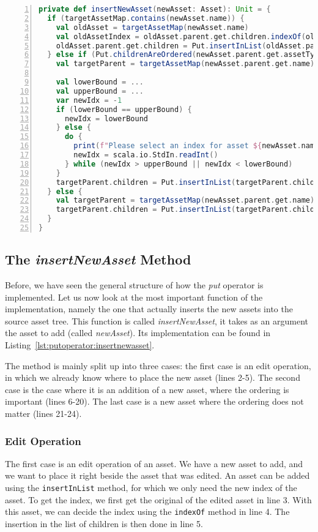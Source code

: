 \begin{lstfloat}
\begin{lstlisting}[language=Scala,numbers=left,showstringspaces=false]
private def insertNewAsset(newAsset: Asset): Unit = {
  if (targetAssetMap.contains(newAsset.name)) {
    val oldAsset = targetAssetMap(newAsset.name)
    val oldAssetIndex = oldAsset.parent.get.children.indexOf(oldAsset)
    oldAsset.parent.get.children = Put.insertInList(oldAsset.parent.get.children, newAsset, oldAssetIndex + 1)
  } else if (Put.childrenAreOrdered(newAsset.parent.get.assetType)) {
    val targetParent = targetAssetMap(newAsset.parent.get.name)

    val lowerBound = ...
    val upperBound = ...
    var newIdx = -1
    if (lowerBound == upperBound) {
      newIdx = lowerBound
    } else {
      do {
        print(f"Please select an index for asset ${newAsset.name}")
        newIdx = scala.io.StdIn.readInt()
      } while (newIdx > upperBound || newIdx < lowerBound)
    }
    targetParent.children = Put.insertInList(targetParent.children, newAsset, newIdx)
  } else {
    val targetParent = targetAssetMap(newAsset.parent.get.name)
    targetParent.children = Put.insertInList(targetParent.children, newAsset, idx = 0)
  }
}
\end{lstlisting}
\caption{Implementation of the \emph{insertNewAsset} method}
\label{lst:putoperator:insertnewasset}
\end{lstfloat}

\subsection{The \emph{insertNewAsset} Method}
Before, we have seen the general structure of how the \emph{put} operator
is implemented. Let us now look at the most important function of the implementation,
namely the one that actually inserts the new assets into the source asset tree.
This function is called \emph{insertNewAsset}, it takes as an argument the asset to add
(called \emph{newAsset}). Its implementation can be found in Listing~\ref{lst:putoperator:insertnewasset}.

The method is mainly split up into three cases: the first case is an edit operation, in
which we already know where to place the new asset (lines 2-5). The second case is the case where
it is an addition of a new asset, where the ordering is important (lines 6-20). The last case is a
new asset where the ordering does not matter (lines 21-24).

\subsubsection*{Edit Operation}
The first case is an edit operation of an asset. We have a new asset to add, and we want to
place it right beside the asset that was edited. An asset can be added using the
\texttt{insertInList} method, for which we only need the new index of the asset.
To get the index, we first get the original of the edited asset in line 3. With this asset,
we can decide the index using the \texttt{indexOf} method in line 4. The insertion in the list
of children is then done in line 5.

